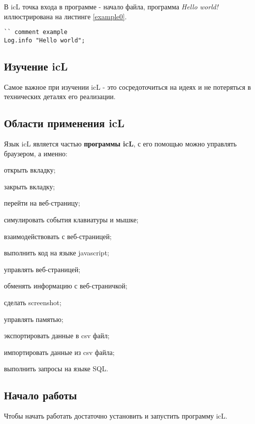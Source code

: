 В icL точка входа в программе - начало файла, программа \textit{Hello world!} иллюстрирована на листинге \ref{example0}.

\begin{lstlisting}[caption=Пример, label=example0]
`` comment example
Log.info "Hello world";
\end{lstlisting}

\subsection{Изучение icL}

Самое важное при изучении icL - это сосредоточиться на идеях и не потеряться в технических деталях его реализации.

\subsection{Области применения icL}

Язык icL является частью \textbf{программы icL}, с его помощью можно управлять браузером, а именно:
\begin{icItems}
\item
	открыть вкладку;
\item
	закрыть вкладку;
\item
	перейти на веб-страницу;
\item
	симулировать события клавиатуры и мышке;
\item
	взаимодействовать с веб-страницей;
\item
	выполнить код на языке javascript;
\item
	управлять веб-страницей;
\item
	обменять информацию с веб-страничкой;
\item
	сделать screenshot;
\item
	управлять памятью;
\item
	экспортировать данные в csv файл;
\item
	импортировать данные из csv файла;
\item
	выполнить запросы на языке SQL.
\end{icItems}

\subsection{Начало работы}

Чтобы начать работать достаточно установить и запустить программу icL.
